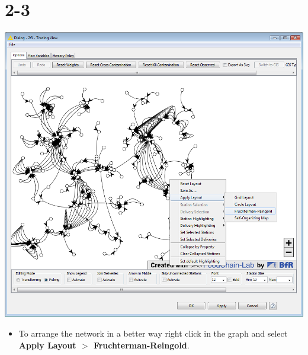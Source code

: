 \documentclass{beamer}
\begin{document}
\section{2-3}
\begin{frame}
	\begin{center}
  		\includegraphics[height=0.6\textheight]{2-3.png}
	\end{center}
	\begin{itemize}
		\item To arrange the network in a better way right click in the graph and select \textbf{Apply Layout $>$ Fruchterman-Reingold}.
	\end{itemize}
\end{frame}
\end{document}
